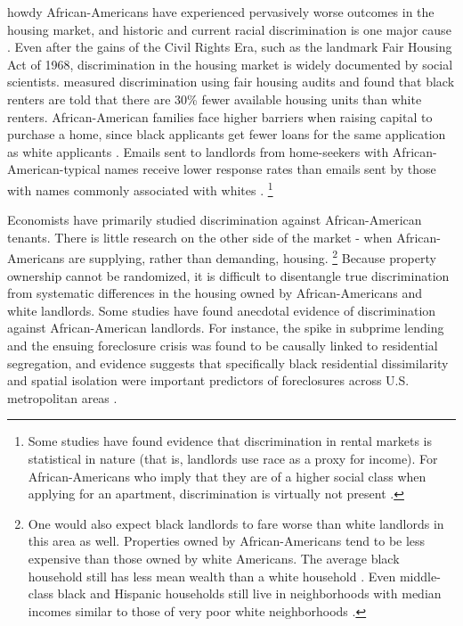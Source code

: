 howdy
African-Americans have experienced pervasively worse outcomes in the housing market, and historic and current racial discrimination is one major cause \citep{krysan}. Even after the gains of the Civil Rights Era, such as the landmark Fair Housing Act of 1968, discrimination in the housing market is widely documented by social scientists. \cite{yinger1} measured discrimination using fair housing audits and found that black renters are told that there are 30\% fewer available housing units than white renters. African-American families face higher barriers when raising capital to purchase a home, since black applicants get fewer loans for the same application as white applicants \citep{pope}. Emails sent to landlords from home-seekers with African-American-typical names receive lower response rates than emails sent by those with names commonly associated with whites \citep{hanson}.%
	\footnote{Some studies have found evidence that discrimination in rental markets is statistical in nature (that is, landlords use race as a proxy for income). For African-Americans who imply that they are of a higher social class when applying for an apartment, discrimination is virtually not present \citep{hanson}.}


Economists have primarily studied discrimination against African-American tenants. There is little research on the other side of the market - when African-Americans are supplying, rather than demanding, housing.%
	\footnote{One would also expect black landlords to fare worse than white landlords in this area as well. Properties owned by African-Americans tend to be less expensive than those owned by white Americans. The average black household still has less mean wealth than a white household \citep{oliver}. Even middle-class black and Hispanic households still live in neighborhoods with median incomes similar to those of very poor white neighborhoods \citep{reardon}.} 
Because property ownership cannot be randomized, it is difficult to disentangle true discrimination from systematic differences in the housing owned by African-Americans and white landlords. Some studies have found anecdotal evidence of discrimination against African-American landlords. For instance, the spike in subprime lending and the ensuing foreclosure crisis was found to be causally linked to residential segregation, and evidence suggests that specifically black residential dissimilarity and spatial isolation were important predictors of foreclosures across U.S. metropolitan areas \citep{foreclosure}.

